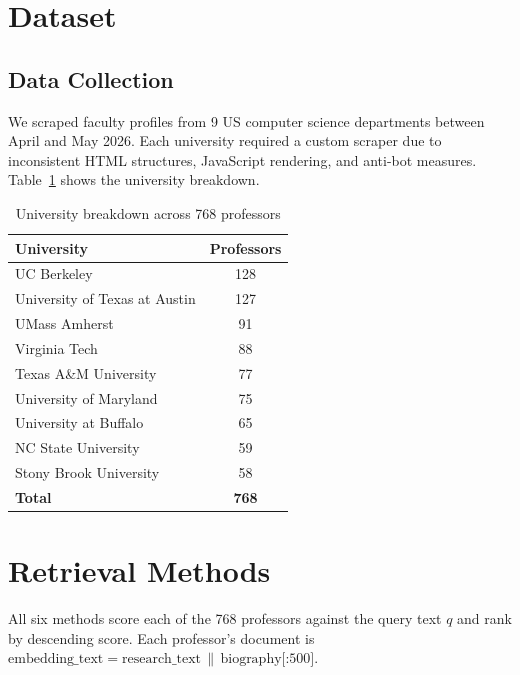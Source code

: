 \documentclass[11pt,a4paper]{article}
\begin{document}
\section{Dataset}

\subsection{Data Collection}

We scraped faculty profiles from 9 US computer science departments between
April and May 2026. Each university required a custom scraper due to
inconsistent HTML structures, JavaScript rendering, and anti-bot measures.
Table~\ref{tab:universities} shows the university breakdown.

\begin{table}[H]
\centering
\caption{University breakdown across 768 professors}
\label{tab:universities}
\begin{tabular}{lc}
\toprule
\textbf{University} & \textbf{Professors} \\
\midrule
UC Berkeley                      & 128 \\
University of Texas at Austin    & 127 \\
UMass Amherst                    & 91  \\
Virginia Tech                    & 88  \\
Texas A\&M University            & 77  \\
University of Maryland           & 75  \\
University at Buffalo            & 65  \\
NC State University              & 59  \\
Stony Brook University           & 58  \\
\midrule
\textbf{Total}                   & \textbf{768} \\
\bottomrule
\end{tabular}
\end{table}

\section{Retrieval Methods}
\label{sec:methods}

All six methods score each of the 768 professors against the query text
$q$ and rank by descending score. Each professor's document is
$\text{embedding\_text} = \text{research\_text} \,\|\, \text{biography[:500]}$.
\end{document}
